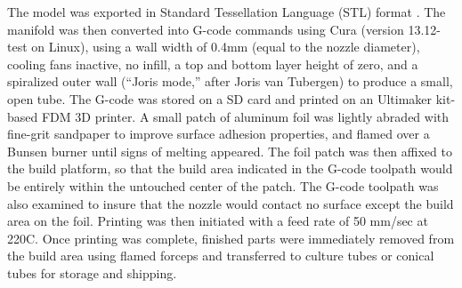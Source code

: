 \documentclass[fleqn,10pt]{wlpeerj}
\begin{document}
The model was exported in Standard Tessellation Language (STL) format \cite{burns1993}. The manifold was then converted into G-code commands \cite{gcode} using Cura (version 13.12-test on Linux), using a wall width of 0.4mm (equal to the nozzle diameter), cooling fans inactive, no infill, a top and bottom layer height of zero, and a spiralized outer wall (``Joris mode,'' after Joris van Tubergen) to produce a small, open tube.  The G-code was stored on a SD card and printed on an Ultimaker kit-based FDM 3D printer. A small patch of aluminum foil was lightly abraded with fine-grit sandpaper to improve surface adhesion properties, and flamed over a Bunsen burner until signs of melting appeared. The foil patch was then affixed to the build platform, so that the build area indicated in the G-code toolpath would be entirely within the untouched center of the patch. The G-code toolpath was also examined to insure that the nozzle would contact no surface except the build area on the foil. Printing was then initiated with a feed rate of 50 mm/sec at 220C. Once printing was complete, finished parts were immediately removed from the build area using flamed forceps and transferred to culture tubes or conical tubes for storage and shipping. 
\end{document}
